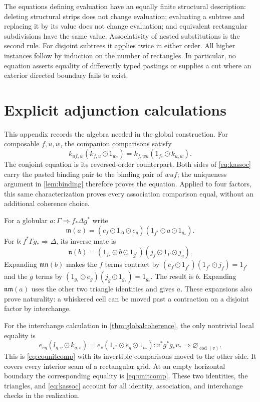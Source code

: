 \documentclass[11pt,reqno]{amsart}
\theoremstyle{plain}
\theoremstyle{definition}
\theoremstyle{remark}
\numberwithin{equation}{section}
\newcommand{\cell}{\mathrel{\Longrightarrow}}
\newcommand{\emp}[1]{\varnothing_{#1}}
\newcommand{\wh}{\mathbin{\odot}}
\begin{document}
The equations defining evaluation have an equally finite structural
description: deleting structural strips does not change evaluation;
evaluating a subtree and replacing it by its value does not change
evaluation; and equivalent rectangular subdivisions have the same
value. Associativity of nested substitutions is the second rule.
For disjoint subtrees it applies twice in either order. All higher
instances follow by induction on the number of rectangles. In
particular, no equation asserts equality of differently typed
pastings or supplies a cut where an exterior directed boundary fails
to exist.

\section{Explicit adjunction calculations}\label{app:bindings}

This appendix records the algebra needed in the global construction.
For composable $f,u,w$, the companion comparisons satisfy
\begin{equation}\label{eq:kassoc}
 k_{uf,w}(k_{f,u}\wh1_{w_*})
   =k_{f,wu}(1_{f_*}\wh k_{u,w}).
\end{equation}
The conjoint equation is its reversed-order counterpart. Both sides
of \cref{eq:kassoc} carry the pasted binding pair to the binding
pair of $wuf$; the uniqueness argument in \cref{lem:binding}
therefore proves the equation. Applied to four factors, this same
characterization proves every association comparison equal, without
an additional coherence choice.

For a globular $a:\Gamma\cell f_*\Delta g^*$ write
\[
 \mathfrak m(a)=(e_f\wh1_\Delta\wh e_g)
                   (1_{f^*}\wh a\wh1_{g_*}).
\]
For $b:f^*\Gamma g_*\cell\Delta$, its inverse mate is
\[
 \mathfrak n(b)=
 (1_{f_*}\wh b\wh1_{g^*})(j_f\wh1_\Gamma\wh j_g).
\]
Expanding $\mathfrak m\mathfrak n(b)$ makes the $f$ terms contract
by $(e_f\wh1_{f^*})(1_{f^*}\wh j_f)=1_{f^*}$ and the $g$
terms by $(1_{g_*}\wh e_g)(j_g\wh1_{g_*})=1_{g_*}$.
The result is $b$. Expanding $\mathfrak n\mathfrak m(a)$ uses the
other two triangle identities and gives $a$. These expansions also
prove naturality: a whiskered cell can be moved past a contraction
on a disjoint factor by interchange.

For the interchange calculation in \cref{thm:globalcoherence}, the
only nontrivial local equality is
\[
 e_{vg}(l_{g,v}\wh k_{g,v})
     =e_v(1_{v^*}\wh e_g\wh1_{v_*})
 :v^*g^*g_*v_*\cell\emp{\operatorname{cod}(v)}.
\]
This is \cref{eq:counitcomp} with its invertible comparisons moved
to the other side. It covers every interior seam of a rectangular
grid. At an empty horizontal boundary the corresponding equality is
\cref{eq:unitcomp}. These two identities, the triangles, and
\cref{eq:kassoc} account for all identity, association, and
interchange checks in the realization.
\end{document}
